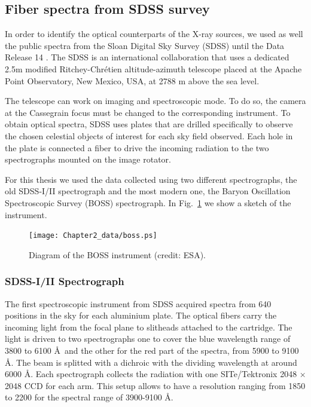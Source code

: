 \subsection{Fiber spectra from SDSS survey}
\label{sec2:sdss}



In order to identify the optical counterparts of the X-ray sources, we used as well the public spectra from the Sloan Digital Sky Survey (SDSS) until the Data Release 14 \citep{abolfathi18}. The SDSS is an international collaboration that uses a dedicated 2.5m modified Ritchey-Chrétien altitude-azimuth telescope placed at the Apache Point Observatory, New Mexico, USA, at 2788 m above the sea level.

The telescope can work on imaging and spectroscopic mode. To do so, the camera at the Cassegrain focus must be changed to the corresponding instrument. To obtain optical spectra, SDSS uses plates that are drilled specifically to observe the chosen celestial objects of interest for each sky field observed. Each hole in the plate is connected a fiber to drive the incoming radiation to the two spectrographs mounted on the image rotator.

For this thesis we used the data collected using two different spectrographs, the old SDSS-I/II spectrograph and the most modern one, the Baryon Oscillation Spectroscopic Survey (BOSS) spectrograph.  In Fig.~\ref{sec2:bosssch} we show a sketch of the instrument.

 \begin{figure}
 \centering
 \texttt{[image: Chapter2\_data/boss.ps]}
    \caption{Diagram of the BOSS instrument (credit: ESA).}
 \label{sec2:bosssch}
 \end{figure}

\subsubsection{SDSS-I/II Spectrograph}
\label{sec2:sdss_spec}


The first spectroscopic instrument from SDSS acquired spectra from 640 positions in the sky for each aluminium plate. The optical fibers carry the incoming light from the focal plane to slitheads attached to the cartridge. The light is driven to two spectrographs one to cover the blue wavelength range of 3800 to 6100 \AA~and the other for the red part of the spectra, from 5900 to 9100 \AA. The beam is splitted with a dichroic with the dividing wavelength at around 6000  \AA. Each spectrograph collects the radiation with one SITe/Tektronix 2048 $\times$ 2048 CCD for each arm. This setup allows to have a resolution ranging from 1850 to 2200 for the spectral range of 3900-9100 \AA.


